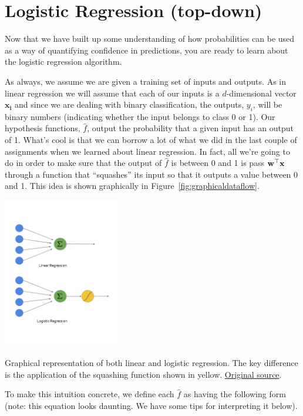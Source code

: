 \documentclass[assignment04_Solutions]{subfiles}
\begin{document}
\section{Logistic Regression (top-down)}
Now that we have built up some understanding of how probabilities can be used as a way of quantifying confidence in predictions, you are ready to learn about the logistic regression algorithm.

As always, we assume we are given a training set of inputs and outputs.  As in linear regression we will assume that each of our inputs is a $d$-dimensional vector $\mathbf{x_i}$ and since we are dealing with binary classification, the outputs, $y_i$, will be binary numbers (indicating whether the input belongs to class 0 or 1).  Our hypothesis functions, $\hat{f}$, output the probability that a given input has an output of 1.  What's cool is that we can borrow a lot of what we did in the last couple of assignments when we learned about linear regression.  In fact, all we're going to do in order to make sure that the output of $\hat{f}$ is between 0 and 1 is pass $\mathbf{w}^\top \mathbf{x}$ through a function that ``squashes'' its input so that it outputs a value between 0 and 1.  This idea is shown graphically in Figure~\ref{fig:graphicaldataflow}.

\begin{marginfigure}
\includegraphics[width=2in]{figures/linearandlogistic}
\caption{Graphical representation of both linear and logistic regression.  The key difference is the application of the squashing function shown in yellow.  \href{https://towardsdatascience.com/building-a-logistic-regression-in-python-301d27367c24}{Original source}.}\label{fig:graphicaldataflow}
\end{marginfigure}
To make this intuition concrete, we define each $\hat{f}$ as having the following form (note: this equation looks daunting. We have some tips for interpreting it below).
\end{document}
